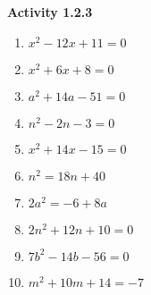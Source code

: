 \noindent\textbf{Activity 1.2.3}

\vspace{0.75ex}

\begin{multicols}{2}
\begin{enumerate}[label = \color{blue}\arabic*. ]
   \item $ x^2 - 12x + 11 = 0 $
   \item $ x^2 + 6x + 8 = 0 $
   \item $ a^2 + 14a - 51 = 0 $
   \item $ n^2 - 2n - 3 = 0 $
   \item $ x^2 + 14x - 15 = 0 $
   \item $ n^2 = 18n + 40 $
   \item $ 2a^2 = -6 + 8a $
   \item $ 2n^2 + 12n + 10 = 0 $
   \item $ 7b^2 - 14b - 56 = 0 $
   \item $ m^2 + 10m + 14 = -7 $
\end{enumerate}
\end{multicols}
				
				
